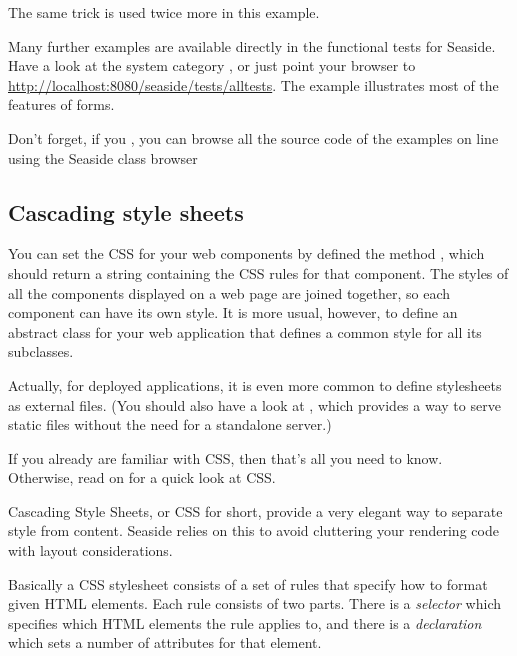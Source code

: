 \documentclass[a4paper,10pt,twoside]{book}
\begin{document}
The same trick is used twice more in this example.

Many further examples are available directly in the functional tests for Seaside.
Have a look at the system category , or just point your browser to \url{http://localhost:8080/seaside/tests/alltests}.
The  example illustrates most of the features of forms.

Don't forget, if you , you can browse all the source code of the examples on line using the Seaside class browser

\subsection{Cascading style sheets}
\label{sec:css}

You can set the CSS for your web components by defined the method , which should return a string containing the CSS rules for that component.
The styles of all the components displayed on a web page are joined together, so each component can have its own style.
It is more usual, however, to define an abstract class for your web application that defines a common style for all its subclasses.

Actually, for deployed applications, it is even more common to define stylesheets as external files.
(You should also have a look at , which provides a way to serve static files without the need for a standalone server.)

If you already are familiar with CSS, then that's all you need to know.
Otherwise, read on for a quick look at CSS.

Cascading Style Sheets, or CSS for short, provide a very elegant way to separate style from content.
Seaside relies on this to avoid cluttering your rendering code with layout considerations.

Basically a CSS stylesheet consists of a set of rules that specify how to format given HTML elements.
Each rule consists of two parts.
There is a \emph{selector} which specifies which HTML elements the rule applies to, and there is a \emph{declaration} which sets a number of attributes for that element.
\end{document}
